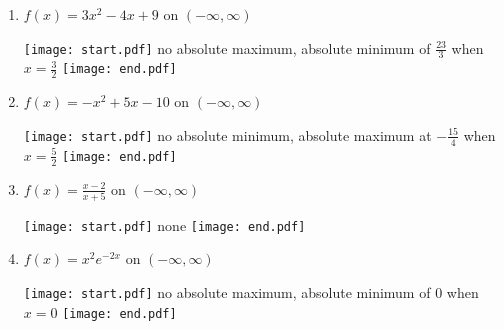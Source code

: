 \documentclass[12pt]{article}
\begin{document}
\begin{enumerate}
\item $f(x) = 3x^2-4x+9$ on $(-\infty, \infty)$ 

\texttt{[image: start.pdf]}
{{no absolute maximum, absolute minimum of $\frac{23}{3}$ when $x=\frac{3}{2}$}}
\texttt{[image: end.pdf]}


\item $f(x) = -x^2+5x-10$ on $(-\infty, \infty)$ 

\texttt{[image: start.pdf]}
{{no absolute minimum, absolute maximum at $-\frac{15}{4}$ when $x=\frac{5}{2}$}}
\texttt{[image: end.pdf]}


\item $f(x) = \frac{x-2}{x+5}$ on $(-\infty, \infty)$ 

\texttt{[image: start.pdf]}
{{none}}
\texttt{[image: end.pdf]}


\item $f(x) = x^2e^{-2x}$ on $(-\infty, \infty)$  

\texttt{[image: start.pdf]}
{{no absolute maximum, absolute minimum of 0 when $x=0$ }}
\texttt{[image: end.pdf]}


\end{enumerate}
\end{document}
